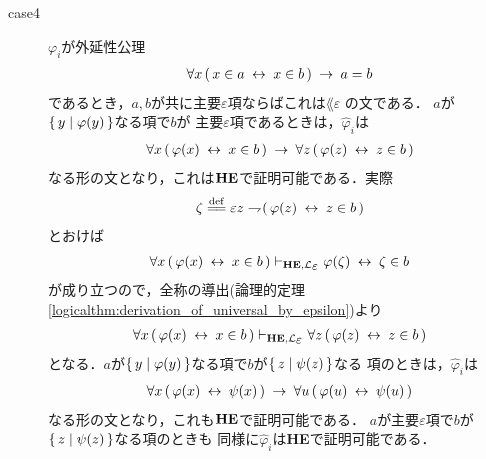 \begin{metaprf}
\begin{description}
			\item[case4] $\varphi_{i}$が外延性公理
				\begin{align}
					\forall x\, (\, x \in a \hspace{0.25em}\leftrightarrow\hspace{0.25em} x \in b\, ) \hspace{0.25em}\rightarrow\hspace{0.25em} a = b
				\end{align}
				であるとき，$a,b$が共に主要$\varepsilon$項ならばこれは$\lang{\varepsilon}$
				の文である．
				$a$が$\{\, y \mid \varphi(y)\, \}$なる項で$b$が
				主要$\varepsilon$項であるときは，$\widehat{\varphi}_{i}$は
				\begin{align}
					\forall x\, (\, \varphi(x) \hspace{0.25em}\leftrightarrow\hspace{0.25em} x \in b\, ) \hspace{0.25em}\rightarrow\hspace{0.25em} 
					\forall z\, (\, \varphi(z) \hspace{0.25em}\leftrightarrow\hspace{0.25em} z \in b\, )
				\end{align}
				なる形の文となり，これは${\bf HE}$で証明可能である．実際
				\begin{align}
					\zeta \defeq \varepsilon z \negation (\, \varphi(z) \lrarrow z \in b\, )
				\end{align}
				とおけば
				\begin{align}
					\forall x\, (\, \varphi(x) \lrarrow x \in b\, ) 
					\provable{\mbox{{\bf HE}},\lang{\varepsilon}} \varphi(\zeta) \lrarrow \zeta \in b
				\end{align}
				が成り立つので，全称の導出(論理的定理\ref{logicalthm:derivation_of_universal_by_epsilon})より
				\begin{align}
					\forall x\, (\, \varphi(x) \lrarrow x \in b\, ) 
					\provable{\mbox{{\bf HE}},\lang{\varepsilon}}
					\forall z\, (\, \varphi(z) \lrarrow z \in b\, )
				\end{align}
				となる．$a$が$\{\, y \mid \varphi(y)\, \}$なる項で$b$が$\{\, z \mid \psi(z)\, \}$なる
				項のときは，$\widehat{\varphi}_{i}$は
				\begin{align}
					\forall x\, (\, \varphi(x) \hspace{0.25em}\leftrightarrow\hspace{0.25em} \psi(x)\, ) \hspace{0.25em}\rightarrow\hspace{0.25em} 
					\forall u\, (\, \varphi(u) \hspace{0.25em}\leftrightarrow\hspace{0.25em} \psi(u)\, )
				\end{align}
				なる形の文となり，これも${\bf HE}$で証明可能である．
				$a$が主要$\varepsilon$項で$b$が$\{\, z \mid \psi(z)\, \}$なる項のときも
				同様に$\widehat{\varphi}_{i}$は{\bf HE}で証明可能である．
			

\end{description}
\end{metaprf}
